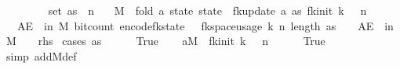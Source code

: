 \begin{isabellebody}
\ \ \ {\isachardoublequoteopen}{\isasymdelta}\ {\isachargreater}{\kern0pt}\ {}{\isachardoublequoteclose}\isanewline
\ \ \ {\isachardoublequoteopen}set\ as\ {\isasymsubseteq}\ {\isacharbraceleft}{\kern0pt}{}{\isachardot}{\kern0pt}{\isachardot}{\kern0pt}{\isacharless}{\kern0pt}n{\isacharbraceright}{\kern0pt}{\isachardoublequoteclose}\isanewline
\ \ \ {\isachardoublequoteopen}M\ {\isasymequiv}\ fold\ {\isacharparenleft}{\kern0pt}{\isasymlambda}a\ state{\isachardot}{\kern0pt}\ state\ {\isasymbind}\ fk{\isacharunderscore}{\kern0pt}update\ a{\isacharparenright}{\kern0pt}\ as\ {\isacharparenleft}{\kern0pt}fk{\isacharunderscore}{\kern0pt}init\ k\ {\isasymdelta}\ {\isasymepsilon}\ n{\isacharparenright}{\kern0pt}{\isachardoublequoteclose}\isanewline
\ \ \ {\isachardoublequoteopen}AE\ {\isasymomega}\ in\ M{\isachardot}{\kern0pt}\ bit{\isacharunderscore}{\kern0pt}count\ {\isacharparenleft}{\kern0pt}encode{\isacharunderscore}{\kern0pt}fk{\isacharunderscore}{\kern0pt}state\ {\isasymomega}{\isacharparenright}{\kern0pt}\ {\isasymle}\ fk{\isacharunderscore}{\kern0pt}space{\isacharunderscore}{\kern0pt}usage\ {\isacharparenleft}{\kern0pt}k{\isacharcomma}{\kern0pt}\ n{\isacharcomma}{\kern0pt}\ length\ as{\isacharcomma}{\kern0pt}\ {\isasymepsilon}{\isacharcomma}{\kern0pt}\ {\isasymdelta}{\isacharparenright}{\kern0pt}{\isachardoublequoteclose}\ {\isacharparenleft}{\kern0pt}\ {\isachardoublequoteopen}AE\ {\isasymomega}\ in\ M{\isachardot}{\kern0pt}\ {\isacharparenleft}{\kern0pt}{\isacharunderscore}{\kern0pt}\ \ {\isasymle}\ {\isacharquery}{\kern0pt}rhs{\isacharparenright}{\kern0pt}{\isachardoublequoteclose}{\isacharparenright}{\kern0pt}\isanewline
%
\isadelimproof
%
\endisadelimproof
%
\isatagproof
{}\isamarkupfalse%
\ {\isacharparenleft}{\kern0pt}cases\ {\isachardoublequoteopen}as\ {\isacharequal}{\kern0pt}\ {\isacharbrackleft}{\kern0pt}{\isacharbrackright}{\kern0pt}{\isachardoublequoteclose}{\isacharparenright}{\kern0pt}\isanewline
\ \ \isamarkupfalse%
\ True\isanewline
\ \ \isamarkupfalse%
\ a{\isacharcolon}{\kern0pt}{\isachardoublequoteopen}M\ {\isacharequal}{\kern0pt}\ fk{\isacharunderscore}{\kern0pt}init\ k\ {\isasymdelta}\ {\isasymepsilon}\ n{\isachardoublequoteclose}\isanewline
\ \ \ \ \isamarkupfalse%
\ True\ \isamarkupfalse%
\ {\isacharparenleft}{\kern0pt}simp\ add{\isacharcolon}{\kern0pt}M{\isacharunderscore}{\kern0pt}def{\isacharparenright}{\kern0pt}\isanewline
\ \ \isamarkupfalse%

\end{isabellebody}
